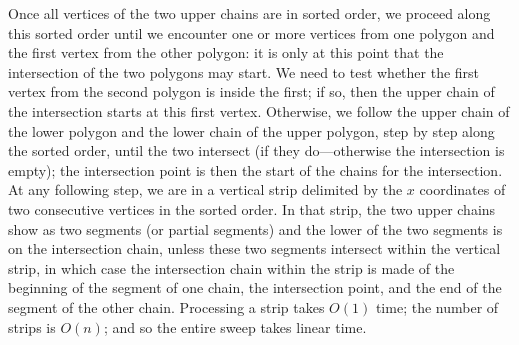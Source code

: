\documentclass[11pt]{article}
\begin{document}
Once all vertices of the two upper chains are in sorted order,
we proceed along this sorted order until we encounter one or more vertices
from one polygon and the first vertex from the other polygon: it is only at
this point that the intersection of the two polygons may start.  We need to
test whether the first vertex from the second polygon is inside the first;
if so, then the upper chain of the intersection starts at this first
vertex. Otherwise, we follow the upper chain of the lower polygon and the
lower chain of the upper polygon, step by step along the sorted order, until
the two intersect (if they do---otherwise the intersection is empty); the
intersection point is then the start of the chains for the intersection.
At any following step, we are in a vertical strip delimited by the $x$
coordinates of two consecutive vertices in the sorted order.  In that strip,
the two upper chains show as two segments (or partial segments) and the lower
of the two segments is on the intersection chain, unless these two segments
intersect within the vertical strip, in which case the intersection chain
within the strip is made of the beginning of the segment of one chain,
the intersection point, and the end of the segment of the other chain.
Processing a strip takes $O(1)$ time; the number of strips is $O(n)$;
and so the entire sweep takes linear time.
\end{document}
